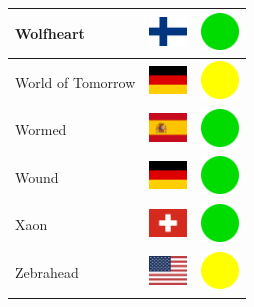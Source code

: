 \documentclass[12pt, a4paper, twoside]{report}
\begin{document}
\begin{center}
\begin{longtable}{|p{5cm}|p{2cm}|p{2cm}|}
Wolfheart & \includegraphics[width=1cm]{4x3/fi} & \includegraphics[width=1cm]{likes/y} \\ \hline
World of Tomorrow & \includegraphics[width=1cm]{4x3/de} & \includegraphics[width=1cm]{likes/m} \\ \hline
Wormed & \includegraphics[width=1cm]{4x3/es} & \includegraphics[width=1cm]{likes/y} \\ \hline
Wound & \includegraphics[width=1cm]{4x3/de} & \includegraphics[width=1cm]{likes/y} \\ \hline
Xaon & \includegraphics[width=1cm]{4x3/ch} & \includegraphics[width=1cm]{likes/y} \\ \hline
Zebrahead & \includegraphics[width=1cm]{4x3/us} & \includegraphics[width=1cm]{likes/m} \\ \hline

\end{longtable}
\end{center}
\end{document}
